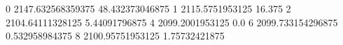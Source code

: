 0 2147.632568359375 48.432373046875
1 2115.5751953125 16.375
2 2104.64111328125 5.44091796875
4 2099.2001953125 0.0
6 2099.733154296875 0.532958984375
8 2100.95751953125 1.75732421875

